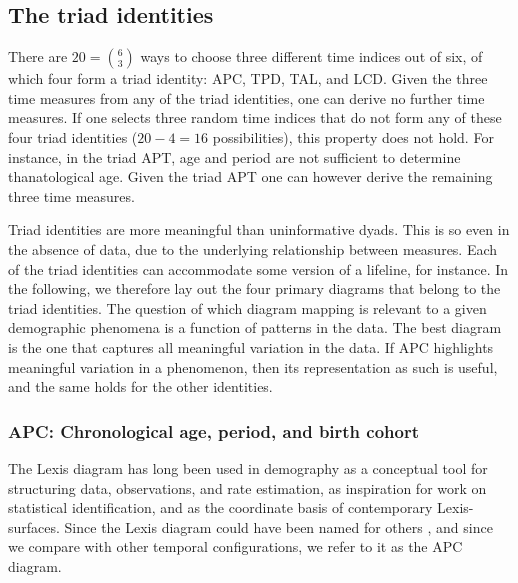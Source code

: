 \documentclass[12pt,oneside,a4paper]{article} %
\theoremstyle{definition}
\begin{document}
\subsection{The triad identities}
\label{sec:triads}
There are $20=\binom{6}{3}$ ways to choose three different time indices out of
six, of which four form a triad identity: APC, TPD, TAL, and LCD.
Given the three time measures from any of the
triad identities, one can derive no further time measures. If one selects three
random time indices that do not form any of these four triad identities
($20-4=16$ possibilities), this property does not hold. For instance, in the
triad APT, age and period are not sufficient to determine thanatological age.
Given the triad APT one can however derive the remaining three time
measures.

Triad identities are more meaningful than uninformative dyads. This
is so even in the absence of data, due to the underlying relationship between
measures. Each of the triad identities can accommodate some version of a
lifeline, for instance. In the following, we therefore lay out the four primary
diagrams that belong to the triad identities. The question of which diagram
mapping is relevant to a given demographic phenomena is a function of
patterns in the data. The best diagram is the one that captures all meaningful
variation in the data. If APC highlights meaningful variation in a phenomenon,
then its representation as such is useful, and the same holds for the other
identities.

\subsubsection{APC: Chronological age, period, and birth cohort}
\label{sec:apc}
\FloatBarrier
The Lexis diagram has long been used in demography as a conceptual
tool for structuring data, observations, and rate estimation, as inspiration for work
on statistical identification, and as the coordinate basis of contemporary
Lexis-surfaces. Since the Lexis diagram could have been named for others
\citep{keiding2011age, vandeschrick2001lexis}, and since we compare with other
temporal configurations, we refer to it as the APC diagram. 
\end{document}
